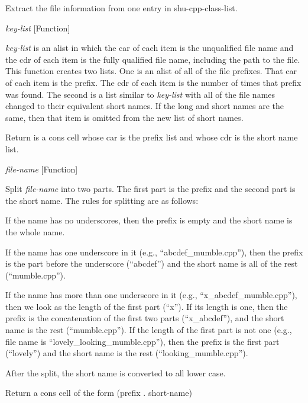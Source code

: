 \begin{doc-string}
Extract the file information from one entry in shu-cpp-class-list.
\end{doc-string}

\vspace{1em}
\noindent
{}
\usebox{\funcname}\emph{key-list}
 \hfill [Function]

\begin{doc-string}
\emph{key-list} is an alist in which the car of each item is the unqualified file
name and the cdr of each item is the fully qualified file name, including the
path to the file.  This function creates two lists.  One is an alist of all of
the file prefixes.  That car of each item is the prefix.  The cdr of each item
is the number of times that prefix was found.  The second is a list similar to
\emph{key-list} with all of the file names changed to their equivalent short names.  If
the long and short names are the same, then that item is omitted from the new
list of short names.

Return is a cons cell whose car is the prefix list and whose cdr is the short
name list.
\end{doc-string}

\vspace{1em}
\noindent
{}
\usebox{\funcname}\emph{file-name}
 \hfill [Function]

\begin{doc-string}
Split \emph{file-name} into two parts.  The first part is the prefix and the second
part is the short name.  The rules for splitting are as follows:

If the name has no underscores, then the prefix is empty and the short name is
the whole name.

If the name has one underscore in it (e.g., ``abcdef\_mumble.cpp''), then the
prefix is the part before the underscore (``abcdef'') and the short name is all
of the rest (``mumble.cpp'').

If the name has more than one underscore in it (e.g., ``x\_abcdef\_mumble.cpp''),
then we look as the length of the first part (``x'').  If its length is one,
then the prefix is the concatenation of the first two parts (``x\_abcdef''), and
the short name is the rest (``mumble.cpp'').  If the length of the first part is
not one (e.g., file name is ``lovely\_looking\_mumble.cpp''), then the prefix is
the first part (``lovely'') and the short name is the rest
(``looking\_mumble.cpp'').

After the split, the short name is converted to all lower case.

Return a cons cell of the form (prefix . short-name)
\end{doc-string}

